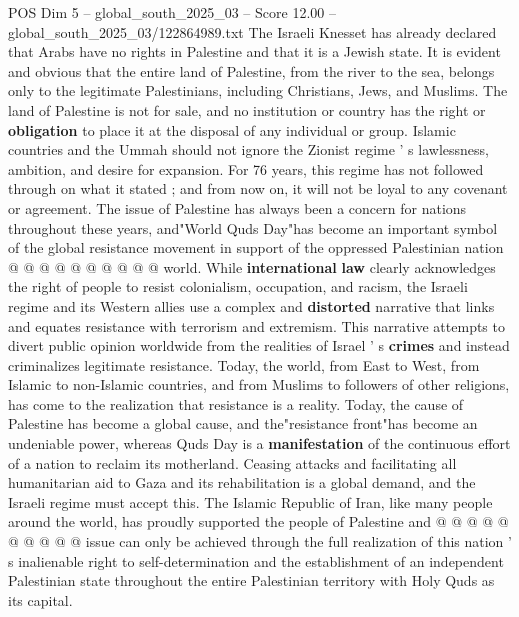 \begin{textsample}{POS Dim 5 – global\_south\_2025\_03 – Score 12.00 – global\_south\_2025\_03/122864989.txt}
The Israeli Knesset has already declared that Arabs have no rights in Palestine and that it is a Jewish state.
It is evident and obvious that the entire land of Palestine, from the river to the sea, belongs only to the legitimate Palestinians, including Christians, Jews, and Muslims.
The land of Palestine is not for sale, and no institution or country has the right or \textbf{obligation} to place it at the disposal of any individual or group.
Islamic countries and the Ummah should not ignore the Zionist regime ' s lawlessness, ambition, and desire for expansion.
For 76 years, this regime has not followed through on what it stated ; and from now on, it will not be loyal to any covenant or agreement.
The issue of Palestine has always been a concern for nations throughout these years, and"World Quds Day"has become an important symbol of the global resistance movement in support of the oppressed Palestinian nation @ @ @ @ @ @ @ @ @ @ world.
While \textbf{international} \textbf{law} clearly acknowledges the right of people to resist colonialism, occupation, and racism, the Israeli regime and its Western allies use a complex and \textbf{distorted} narrative that links and equates resistance with terrorism and extremism.
This narrative attempts to divert public opinion worldwide from the realities of Israel ' s \textbf{crimes} and instead criminalizes legitimate resistance.
Today, the world, from East to West, from Islamic to non-Islamic countries, and from Muslims to followers of other religions, has come to the realization that resistance is a reality.
Today, the cause of Palestine has become a global cause, and the"resistance front"has become an undeniable power, whereas Quds Day is a \textbf{manifestation} of the continuous effort of a nation to reclaim its motherland.
Ceasing attacks and facilitating all humanitarian aid to Gaza and its rehabilitation is a global demand, and the Israeli regime must accept this.
The Islamic Republic of Iran, like many people around the world, has proudly supported the people of Palestine and @ @ @ @ @ @ @ @ @ @ issue can only be achieved through the full realization of this nation ' s inalienable right to self-determination and the establishment of an independent Palestinian state throughout the entire Palestinian territory with Holy Quds as its capital.

\end{textsample}
